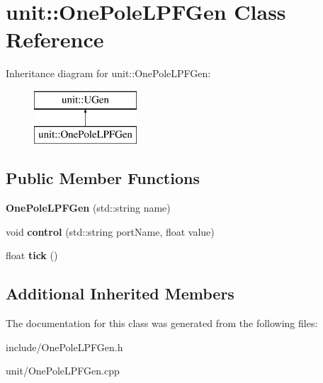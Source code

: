 \hypertarget{classunit_1_1OnePoleLPFGen}{}\section{unit\+:\+:One\+Pole\+L\+P\+F\+Gen Class Reference}
\label{classunit_1_1OnePoleLPFGen}
Inheritance diagram for unit\+:\+:One\+Pole\+L\+P\+F\+Gen\+:\begin{figure}[H]
\begin{center}
\leavevmode
\includegraphics[height=2.000000cm]{classunit_1_1OnePoleLPFGen}
\end{center}
\end{figure}
\subsection*{Public Member Functions}
\begin{DoxyCompactItemize}
\item 
{\bfseries One\+Pole\+L\+P\+F\+Gen} (std\+::string name)\hypertarget{classunit_1_1OnePoleLPFGen_aea39a9562852ac47fdd576fd8b583b9f}{}\label{classunit_1_1OnePoleLPFGen_aea39a9562852ac47fdd576fd8b583b9f}

\item 
void {\bfseries control} (std\+::string port\+Name, float value)\hypertarget{classunit_1_1OnePoleLPFGen_a8f2df9b7406edadf7dc34e7e65b2b67c}{}\label{classunit_1_1OnePoleLPFGen_a8f2df9b7406edadf7dc34e7e65b2b67c}

\item 
float {\bfseries tick} ()\hypertarget{classunit_1_1OnePoleLPFGen_a5e5288841ff8112113f2d6ec1f03f375}{}\label{classunit_1_1OnePoleLPFGen_a5e5288841ff8112113f2d6ec1f03f375}

\end{DoxyCompactItemize}
\subsection*{Additional Inherited Members}


The documentation for this class was generated from the following files\+:\begin{DoxyCompactItemize}
\item 
include/One\+Pole\+L\+P\+F\+Gen.\+h\item 
unit/One\+Pole\+L\+P\+F\+Gen.\+cpp\end{DoxyCompactItemize}
